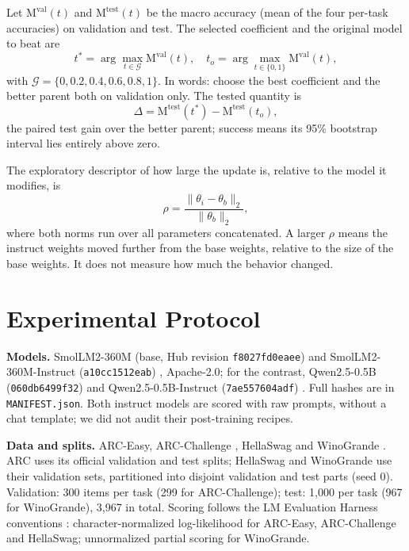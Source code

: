 \documentclass[conference]{IEEEtran}
\begin{document}
Let $\mathrm{M}^{\mathrm{val}}(t)$ and $\mathrm{M}^{\mathrm{test}}(t)$ be the macro accuracy (mean of the four per-task accuracies) on validation and test. The selected coefficient and the original model to beat are
\begin{equation}
t^\ast=\arg\max_{t\in\mathcal{G}}\mathrm{M}^{\mathrm{val}}(t),\quad t_o=\arg\max_{t\in\{0,1\}}\mathrm{M}^{\mathrm{val}}(t),
\end{equation}
with $\mathcal{G}=\{0,0.2,0.4,0.6,0.8,1\}$. In words: choose the best coefficient and the better parent both on validation only. The tested quantity is
\begin{equation}
\Delta=\mathrm{M}^{\mathrm{test}}(t^\ast)-\mathrm{M}^{\mathrm{test}}(t_o),
\end{equation}
the paired test gain over the better parent; success means its 95\% bootstrap interval lies entirely above zero.

The exploratory descriptor of how large the update is, relative to the model it modifies, is
\begin{equation}
\rho=\frac{\lVert\theta_i-\theta_b\rVert_2}{\lVert\theta_b\rVert_2},
\end{equation}
where both norms run over all parameters concatenated. A larger $\rho$ means the instruct weights moved further from the base weights, relative to the size of the base weights. It does not measure how much the behavior changed.

\section{Experimental Protocol}
\textbf{Models.} SmolLM2-360M (base, Hub revision \texttt{f8027fd0eaee}) and SmolLM2-360M-Instruct (\texttt{a10cc1512eab}) \cite{allal2025smollm2}, Apache-2.0; for the contrast, Qwen2.5-0.5B (\texttt{060db6499f32}) and Qwen2.5-0.5B-Instruct (\texttt{7ae557604adf}) \cite{qwen2024qwen25}. Full hashes are in \texttt{MANIFEST.json}. Both instruct models are scored with raw prompts, without a chat template; we did not audit their post-training recipes.

\textbf{Data and splits.} ARC-Easy, ARC-Challenge \cite{clark2018arc}, HellaSwag \cite{zellers2019hellaswag} and WinoGrande \cite{sakaguchi2020winogrande}. ARC uses its official validation and test splits; HellaSwag and WinoGrande use their validation sets, partitioned into disjoint validation and test parts (seed 0). Validation: 300 items per task (299 for ARC-Challenge); test: 1{,}000 per task (967 for WinoGrande), 3{,}967 in total. Scoring follows the LM Evaluation Harness conventions \cite{gao2023harness}: character-normalized log-likelihood for ARC-Easy, ARC-Challenge and HellaSwag; unnormalized partial scoring for WinoGrande.
\end{document}
